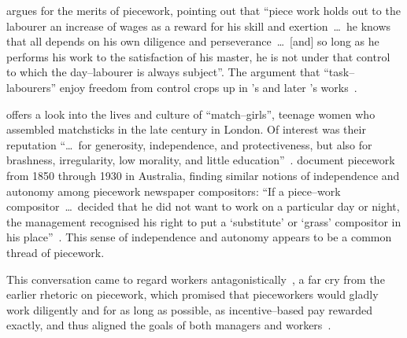 \documentclass[trackingWork]{subfiles}
\begin{document}


\citeauthor{hughRaynbirdTaskWork} argues for the merits of piecework,
pointing out that
``piece work holds out to the labourer an increase of wages as a reward for his skill and exertion~\dots~he knows that all depends on his own diligence and perseverance~\dots~[and] so long as he performs his work to the satisfaction of his master, he is not under that control to which the day--labourer is always subject''.
The argument that ``task--labourers'' enjoy freedom from control crops up in \citeauthor{hughRaynbirdTaskWork}'s and later \citeauthor{rowan1901premium}'s works~\cite{hughRaynbirdTaskWork,rowan1901premium}.

\citeauthor{10.2307/3827491} offers a look into the lives and culture of ``match--girls'', teenage women who assembled matchsticks in the late  century in London. %
Of interest was their reputation ``\dots~for generosity, independence, and protectiveness,
but also for brashness, irregularity, low morality, and little education''~\cite{10.2307/3827491}.
\citeauthor{10.2307/27508091} document piecework from 1850 through 1930 in Australia,
finding similar notions of independence and autonomy among piecework newspaper compositors:
``If a piece--work compositor~\dots~decided that he did not want to work on a particular day or night, the management recognised his right to put a `substitute' or `grass' compositor in his place''~\cite{10.2307/27508091}.
This sense of independence and autonomy appears to be a common thread of piecework.

This conversation came to regard workers antagonistically~\cite{roy1954efficiency}, a far cry from the earlier rhetoric on piecework, which promised that
pieceworkers would gladly work diligently and for as long as possible, as
incentive--based pay rewarded exactly, and thus aligned the goals of both managers and workers~\cite{clark1908cotton}.
\end{document}
